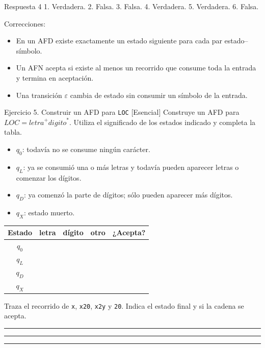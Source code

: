 \documentclass[11pt,spanish]{article}
\newcommand{\blank}[1][4cm]{\rule{#1}{0.4pt}}
\newcommand{\espaciosalida}{0.10cm}
\newcommand{\espaciosalida}{0.60cm}
\begin{document}
\ifrespuestas
\begin{respuesta}{Respuesta 4}
1. Verdadera. 2. Falsa. 3. Falsa. 4. Verdadera. 5. Verdadera. 6. Falsa.

Correcciones:
\begin{itemize}[leftmargin=*]
    \item En un AFD existe exactamente un estado siguiente para cada par estado--símbolo.
    \item Un AFN acepta si existe al menos un recorrido que consume toda la entrada y termina en aceptación.
    \item Una transición \(\varepsilon\) cambia de estado sin consumir un símbolo de la entrada.
\end{itemize}
\end{respuesta}
\fi

\begin{ejercicio}{Ejercicio 5. Construir un AFD para \texttt{LOC} \hfill {\small [Esencial]}}
Construye un AFD para \(\mathit{LOC}=\mathit{letra}^{+}\mathit{digito}^{*}\). Utiliza el significado de los estados indicado y completa la tabla.

\begin{itemize}[leftmargin=*]
    \item \(q_0\): todavía no se consume ningún carácter.
    \item \(q_L\): ya se consumió una o más letras y todavía pueden aparecer letras o comenzar los dígitos.
    \item \(q_D\): ya comenzó la parte de dígitos; sólo pueden aparecer más dígitos.
    \item \(q_X\): estado muerto.
\end{itemize}

\begin{center}
\small
\renewcommand{\arraystretch}{1.3}
\begin{tabular}{|c|c|c|c|c|}
\hline
\textbf{Estado} & \textbf{letra} & \textbf{dígito} & \textbf{otro} & \textbf{¿Acepta?} \tabularnewline
\hline
\(q_0\) & & & & \tabularnewline[\espaciosalida]
\hline
\(q_L\) & & & & \tabularnewline[\espaciosalida]
\hline
\(q_D\) & & & & \tabularnewline[\espaciosalida]
\hline
\(q_X\) & & & & \tabularnewline[\espaciosalida]
\hline
\end{tabular}
\end{center}

Traza el recorrido de \texttt{x}, \texttt{x20}, \texttt{x2y} y \texttt{20}. Indica el estado final y si la cadena se acepta.

\ifrespuestas\else
\blank[14cm]

\blank[14cm]

\blank[14cm]
\fi
\end{ejercicio}
\end{document}
